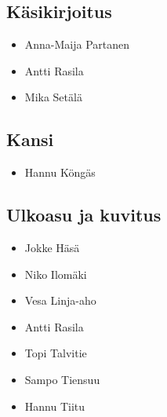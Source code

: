 \subsection*{Käsikirjoitus}
\begin{itemize}
\item Anna-Maija Partanen
\item Antti Rasila
\item Mika Setälä
\end{itemize}

\subsection*{Kansi}
\begin{itemize}
\item Hannu Köngäs
\end{itemize}

\subsection*{Ulkoasu ja kuvitus}
\begin{itemize}
\item Jokke Häsä
\item Niko Ilomäki
\item Vesa Linja-aho
\item Antti Rasila
\item Topi Talvitie
\item Sampo Tiensuu
\item Hannu Tiitu
\end{itemize}

